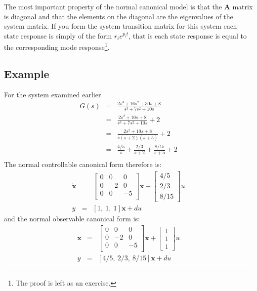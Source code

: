 The most important property of the normal canonical model is that
the $\mathbf{A}$ matrix is diagonal and that the elements on the
diagonal are the eigenvalues of the system matrix. If you form the
system transition matrix for this system each state response is
simply of the form $r_i e^{p_i t}$, that is each state response is
equal to the corresponding mode response\footnote{The proof is
left as an exercise.}.

\subsection*{Example}
For the system examined earlier
\begin{eqnarray*}
G(s) &=& \frac{2s^3 + 16s^2 + 30s + 8}{s^3 + 7s^2 + 10s} \\
 &=&
\frac{2s^2 + 10s + 8}{s^3 + 7s^2 + 10s} + 2 \\
 &=& \frac{2s^2 + 10s + 8}{s(s+2)(s+5)} + 2 \\
 &=& \frac{4/5}{s} + \frac{2/3}{s+2} + \frac{8/15}{s+5} + 2
\\
\end{eqnarray*}
The normal controllable canonical form therefore is:
\begin{eqnarray*}
\mathbf{\dot{x}}&=&\left[\begin{array}{ccc}
  0 & 0 & 0  \\
  0 & -2 & 0  \\
  0 & 0 & -5  \\
 \end{array}\right] \mathbf{x} + \left[\begin{array}{c}
  4/5 \\
  2/3 \\
  8/15
\end{array}\right] u\\ y &=& \left[1,\ 1,\ 1\right] \mathbf{x} + d u
\end{eqnarray*}
and the normal observable canonical form is:
\begin{eqnarray*}
\mathbf{\dot{x}}&=&\left[\begin{array}{ccc}
  0 & 0 & 0  \\
  0 & -2 & 0  \\
  0 & 0 & -5  \\
 \end{array}\right] \mathbf{x} + \left[\begin{array}{c}
  1 \\
  1  \\
  1
\end{array}\right] u\\ y &=& \left[4/5,\ 2/3,\ 8/15\right] \mathbf{x} + d u
\end{eqnarray*}

